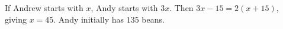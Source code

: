 If Andrew starts with $x$, Andy starts with $3x$. Then $3x-15=2(x+15)$, giving $x=45$. Andy initially has $\boxed{135}$ beans.

